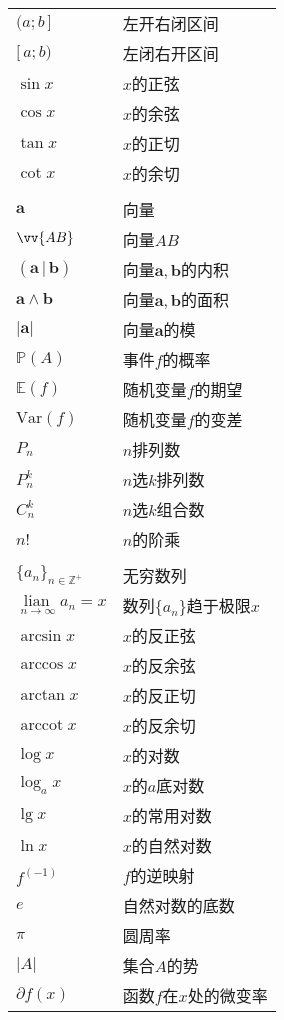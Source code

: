 \documentclass[12pt,UTF8]{article}
\newcommand{\lian}[1]{
    \underset{#1}{\operatorname{lian}\,}
}
\newcommand{\arccot}{\operatorname{arccot}}
\begin{document}
\begin{longtable}{ m{15em} m{15em} }
    $(a;b\,]$ & 左开右闭区间 \\
    $[\,a;b)$ & 左闭右开区间 \\
    $\sin{x}$ & $x$的正弦 \\
    $\cos{x}$ & $x$的余弦 \\
    $\tan{x}$ & $x$的正切 \\
    $\cot{x}$ & $x$的余切 \\
    & \\
    $\mathbf{a}$ & 向量 \\
    $\vv{AB}$ & 向量$AB$\\
    $(\mathbf{a}\, | \, \mathbf{b})$ & 向量$\mathbf{a},\mathbf{b}$的内积 \\
    $\mathbf{a}\wedge \mathbf{b}$ & 向量$\mathbf{a},\mathbf{b}$的面积 \\
    $|\mathbf{a}|$ & 向量$\mathbf{a}$的模 \\
    $\mathbb{P}(A)$ & 事件$f$的概率 \\
    $\mathbb{E}(f)$ & 随机变量$f$的期望 \\
    $\mathrm{Var}(f)$ & 随机变量$f$的变差 \\
    $P_n$ & $n$排列数 \\
    $P_n^k$ & $n$选$k$排列数 \\
    $C_n^k$ & $n$选$k$组合数 \\
    $n!$ & $n$的阶乘 \\
    & \\
    $\displaystyle\{a_n\}_{n\in\mathbb{Z}^+}$ & 无穷数列 \\
    $\lian{n\to \infty} a_n = x$ & 数列$\{a_n\}$趋于极限$x$ \\
    $\arcsin{x}$ & $x$的反正弦 \\
    $\arccos{x}$ & $x$的反余弦 \\
    $\arctan{x}$ & $x$的反正切 \\
    $\arccot{x}$ & $x$的反余切 \\
    $\log{x}$ & $x$的对数 \\
    $\log_a{x}$ & $x$的$a$底对数 \\
    $\lg{x}$ & $x$的常用对数 \\
    $\ln{x}$ & $x$的自然对数 \\
    $f^{(-1)}$ & $f$的逆映射 \\
    $e$ & 自然对数的底数 \\
    $\pi$ & 圆周率 \\
    $|A|$ & 集合$A$的势 \\
    $\partial f(x)$ & 函数$f$在$x$处的微变率 \\

\end{longtable}
\end{document}
